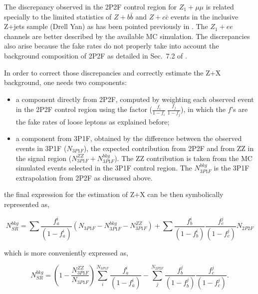 The discrepancy observed in the 2P2F control region for $Z_{1}+\mu\mu$ is related specially to the limited statistics of $Z+b\bar{b}$ and $Z+c\bar{c}$ events in the inclusive Z+jets sample (Drell Yan) as has been pointed previously in \cite{bib:CMS-AN-12-367,bib:CMS-AN-13-108}. The $Z_{1}+ee$ channels are better described by the available MC simulation. The discrepancies also arise because the fake rates do not properly take into account the background composition of 2P2F as detailed in Sec.~7.2 of \cite{bib:CMS-AN-16-442}.

In order to correct those discrepancies and correctly estimate the Z+X background, one needs two components:

\begin{itemize}
	\item a component directly from 2P2F, computed by weighting each observed event in the 2P2F control region using the factor ($\frac{f_{i}}{1-f_{i}}~\frac{f_{j}}{1-f_{j}}$), in which the $f$'s are the fake rates of loose leptons as explained before;
	\item a component from 3P1F, obtained by the difference between the observed events in 3P1F ($N_{3P1F}$), the expected contribution from 2P2F and from ZZ in the signal region ($N^{ZZ}_{3P1F}+N^{bkg}_{3P1F}$). The ZZ contribution is taken from the MC simulated events selected in the 3P1F control region. The $N^{bkg}_{3P1F}$ is the 3P1F extrapolation from 2P2F as discussed above.
\end{itemize}

the final expression for the estimation of Z+X can be then symbolically represented as,

\begin{equation}
N^{bkg}_{SR} = \sum \frac{f^{i}_{a}}{(1-f^{i}_{a})}(N_{3P1F}-N^{bkg}_{3P1F}-N^{ZZ}_{3P1F}) + \sum \frac{f^{i}_{b}}{(1-f^{i}_{b})} \frac{f^{j}_{c}}{(1-f^{j}_{c})} N_{2P2F}
\label{eq:zx_formula1}
\end{equation}

which is more conveniently expressed as,

\begin{equation}
N^{bkg}_{SR} = (1 - \frac{N^{ZZ}_{3P1F}}{N_{3P1F}}) \sum^{N_{3P1F}}_{i} \frac{f^{i}_{a}}{(1-f^{i}_{a})} - \sum^{N_{2P2F}}_{j} \frac{f^{j}_{b}}{(1-f^{j}_{b})} \frac{f^{j}_{c}}{(1-f^{j}_{c})}.
\label{eq:zx_formula2}
\end{equation}

